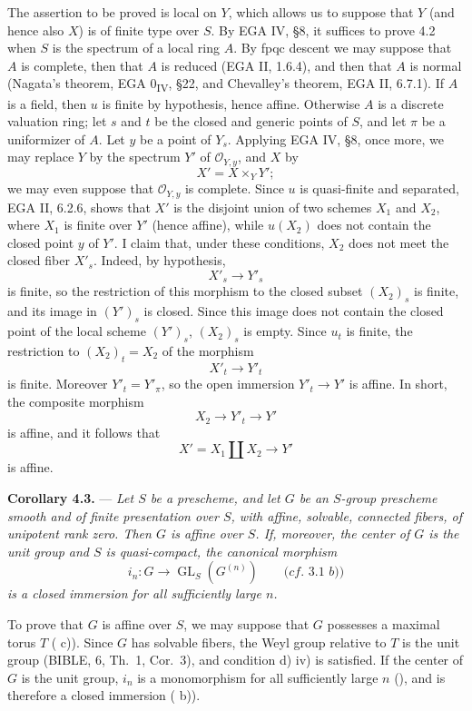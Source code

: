 \medskip
The assertion to be proved is local on \(Y\), which allows us to
suppose that \(Y\) (and hence also \(X\)) is of finite type over
\(S\). By EGA IV, \S8, it suffices to prove 4.2 when \(S\) is the
spectrum of a local ring \(A\). By fpqc descent we may suppose
that \(A\) is complete, then that \(A\) is reduced (EGA II,
1.6.4), and then that \(A\) is normal (Nagata's theorem, EGA
0\textsubscript{IV}, \S22, and Chevalley's theorem, EGA II,
6.7.1). If \(A\) is a field, then \(u\) is finite by hypothesis,
hence affine. Otherwise \(A\) is a discrete valuation ring; let
\(s\) and \(t\) be the closed and generic points of \(S\), and let
\(\pi\) be a uniformizer of \(A\). Let \(y\) be a point of \(Y_s\).
Applying EGA IV, \S8, once more, we may replace \(Y\) by the
spectrum \(Y'\) of \(\mathcal O_{Y,y}\), and \(X\) by
\[
  X'=X\times_Y Y';
\]
we may even suppose that \(\mathcal O_{Y,y}\) is complete. Since
\(u\) is quasi-finite and separated, EGA II, 6.2.6, shows that
\(X'\) is the disjoint union of two schemes \(X_1\) and \(X_2\),
where \(X_1\) is finite over \(Y'\) (hence affine), while
\(u(X_2)\) does not contain the closed point \(y\) of \(Y'\). I
claim that, under these conditions, \(X_2\) does not meet the
closed fiber \(X'_s\). Indeed, by hypothesis,
\[
  X'_s\longrightarrow Y'_s
\]
is finite, so the restriction of this morphism to the closed
subset \((X_2)_s\) is finite, and its image in \((Y')_s\) is
closed. Since this image does not contain the closed point of the
local scheme \((Y')_s\), \((X_2)_s\) is empty. Since \(u_t\) is
finite, the restriction to \((X_2)_t=X_2\) of the morphism
\[
  X'_t\longrightarrow Y'_t
\]
is finite. Moreover \(Y'_t=Y'_\pi\), so the open immersion
\(Y'_t\to Y'\) is affine. In short, the composite morphism
\[
  X_2\longrightarrow Y'_t\longrightarrow Y'
\]
is affine, and it follows that
\[
  X'=X_1\amalg X_2\longrightarrow Y'
\]
is affine.

\medskip
\noindent{}%
\textbf{Corollary 4.3.} --- \textit{Let \(S\) be a prescheme, and
let \(G\) be an \(S\)-group prescheme smooth and of finite
presentation over \(S\), with affine, solvable, connected fibers,
of unipotent rank zero. Then \(G\) is affine over \(S\). If,
moreover, the center of \(G\) is the unit group and \(S\) is
quasi-compact, the canonical morphism}
\[
  i_n:G\longrightarrow\operatorname{GL}_S(G^{(n)})
  \qquad\textit{(cf.\ 3.1 b))}
\]
\textit{is a closed immersion for all sufficiently large \(n\).}

\medskip
To prove that \(G\) is affine over \(S\), we may suppose that
\(G\) possesses a maximal torus \(T\) ( c)). Since \(G\) has
solvable fibers, the Weyl group relative to \(T\) is the unit
group (BIBLE, 6, Th.\ 1, Cor.\ 3), and condition  d) iv) is
satisfied. If the center of \(G\) is the unit group, \(i_n\) is a
monomorphism for all sufficiently large \(n\) (), and is
therefore a closed immersion ( b)).

